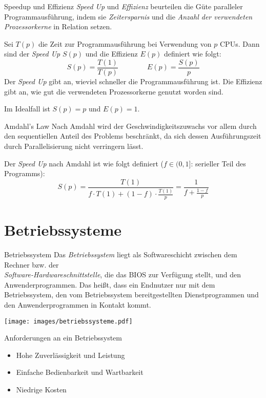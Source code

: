 \documentclass[german]{../spicker}
\begin{document}
\begin{bonus}{Speedup und Effizienz}
    \emph{Speed Up} und \emph{Effizienz} beurteilen die Güte paralleler Programmausführung, indem sie \emph{Zeitersparnis} und die \emph{Anzahl der verwendeten Prozessorkerne} in Relation setzen.

    Sei $T(p)$ die Zeit zur Programmausführung bei Verwendung von $p$ CPUs. Dann sind der \emph{Speed Up} $S(p)$ und die Effizienz $E(p)$ definiert wie folgt:
    $$
        S(p) = \frac{T(1)}{T(p)} \qquad  \qquad E(p) = \frac{S(p)}{p}
    $$
    Der \emph{Speed Up} gibt an, wieviel schneller die Programmausführung ist.
    Die Effizienz gibt an, wie gut die verwendeten Prozessorkerne genutzt worden sind.

    Im Idealfall ist $S(p) = p$ und $E(p) = 1$.
\end{bonus}

\begin{bonus}{Amdahl's Law}
    Nach Amdahl wird der Geschwindigkeitszuwachs vor allem durch den sequentiellen Anteil des Problems beschränkt, da sich dessen Ausführungszeit durch Parallelisierung nicht verringern lässt.

    Der \emph{Speed Up} nach Amdahl ist wie folgt definiert ($f \in (0, 1]$: serieller Teil des Programms):
    $$
        S(p) = \frac{T(1)}{f \cdot T(1) + (1-f) \cdot \frac{T(1)}{p}} = \frac{1}{f + \frac{1-f}{p}}
    $$
\end{bonus}

\section{Betriebssysteme}

\begin{defi}{Betriebssystem}
    Das \emph{Betriebssystem} liegt als Softwareschicht zwischen dem Rechner bzw. der \\ \emph{Software-Hardwareschnittstelle}, die das BIOS zur Verfügung stellt, und den Anwenderprogrammen.
    Das heißt, dass ein Endnutzer nur mit dem Betriebssystem, den vom Betriebssystem bereitgestellten Dienstprogrammen und den Anwenderprogrammen in Kontakt kommt.

    \begin{center}
        \texttt{[image: images/betriebssysteme.pdf]}
    \end{center}
\end{defi}

\begin{bonus}{Anforderungen an ein Betriebssystem}
    \begin{itemize}
        \item Hohe Zuverlässigkeit und Leistung
        \item Einfache Bedienbarkeit und Wartbarkeit
        \item Niedrige Kosten
    \end{itemize}
\end{bonus}
\end{document}
